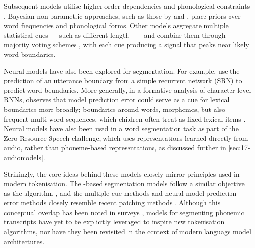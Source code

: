 
Subsequent models utilise higher-order \ngram dependencies \citep{Venkataraman2001} and phonological constraints \citep{Blanchard2010}. Bayesian non-parametric approaches, such as those by \citet{Goldwater2009} and \citet{algayres_dp-parse_2022}, place priors over word frequencies and phonological forms. Other models aggregate multiple statistical cues --- such as different-length \ngrams~--- and combine them through majority voting schemes \citep{ccoltekin2014explicit, Coltekin2017, goriely2023word}, with each cue producing a signal that peaks near likely word boundaries.


Neural models have also been explored for segmentation. For example, \citet{christiansen1998learning} use the prediction of an utterance boundary from a simple recurrent network (SRN) to predict word boundaries. More generally, in a formative analysis of character-level RNNs, \citet{elman1990finding} observes that model prediction error could serve as a cue for lexical boundaries more broadly; boundaries around words, morphemes, but also frequent multi-word sequences, which children often treat as fixed lexical items \citep{macwhinney1978}. Neural models have also been used in a word segmentation task as part of the Zero Resource Speech challenge, which uses representations learned directly from audio, rather than phoneme-based representations, as discussed further in \cref{sec:17-audiomodels}.

Strikingly, the core ideas behind these models closely mirror principles used in modern tokenisation. The \ngram-based segmentation models follow a similar objective as the \unigram algorithm \citep{kudo-2018-unigram}, and the multiple-cue methods and neural model prediction error methods closely resemble recent patching methods \citep{pagnoni2024byte}. Although this conceptual overlap has been noted in surveys \citep{mielke2021between}, models for segmenting phonemic transcripts have yet to be explicitly leveraged to inspire new tokenisation algorithms, nor have they been revisited in the context of modern language model architectures.

